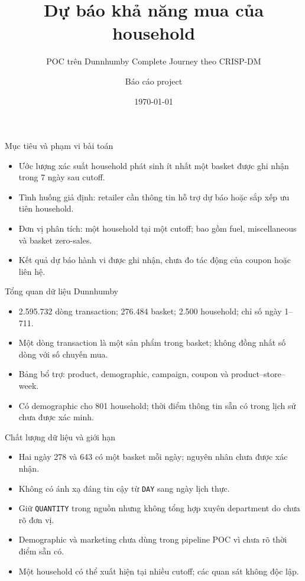 \documentclass[aspectratio=169,10pt]{beamer}
\title{Dự báo khả năng mua của household}
\subtitle{POC trên Dunnhumby Complete Journey theo CRISP-DM}
\author{Báo cáo project}
\date{\today}
\begin{document}
\frame{\titlepage}

\begin{frame}{Mục tiêu và phạm vi bài toán}
\begin{itemize}
  \item Ước lượng xác suất household phát sinh ít nhất một basket được ghi nhận trong 7 ngày sau cutoff.
  \item Tình huống giả định: retailer cần thông tin hỗ trợ dự báo hoặc sắp xếp ưu tiên household.
  \item Đơn vị phân tích: một household tại một cutoff; bao gồm fuel, miscellaneous và basket zero-sales.
  \item Kết quả dự báo hành vi được ghi nhận, chưa đo tác động của coupon hoặc liên hệ.
\end{itemize}
\end{frame}

\begin{frame}{Tổng quan dữ liệu Dunnhumby}
\begin{itemize}
  \item 2.595.732 dòng transaction; 276.484 basket; 2.500 household; chỉ số ngày 1--711.
  \item Một dòng transaction là một sản phẩm trong basket; không đồng nhất số dòng với số chuyến mua.
  \item Bảng bổ trợ: product, demographic, campaign, coupon và product--store--week.
  \item Có demographic cho 801 household; thời điểm thông tin sẵn có trong lịch sử chưa được xác minh.
\end{itemize}
\end{frame}

\begin{frame}{Chất lượng dữ liệu và giới hạn}
\begin{itemize}
  \item Hai ngày 278 và 643 có một basket mỗi ngày; nguyên nhân chưa được xác nhận.
  \item Không có ánh xạ đáng tin cậy từ \texttt{DAY} sang ngày lịch thực.
  \item Giữ \texttt{QUANTITY} trong nguồn nhưng không tổng hợp xuyên department do chưa rõ đơn vị.
  \item Demographic và marketing chưa dùng trong pipeline POC vì chưa rõ thời điểm sẵn có.
  \item Một household có thể xuất hiện tại nhiều cutoff; các quan sát không độc lập.
\end{itemize}
\end{frame}
\end{document}
